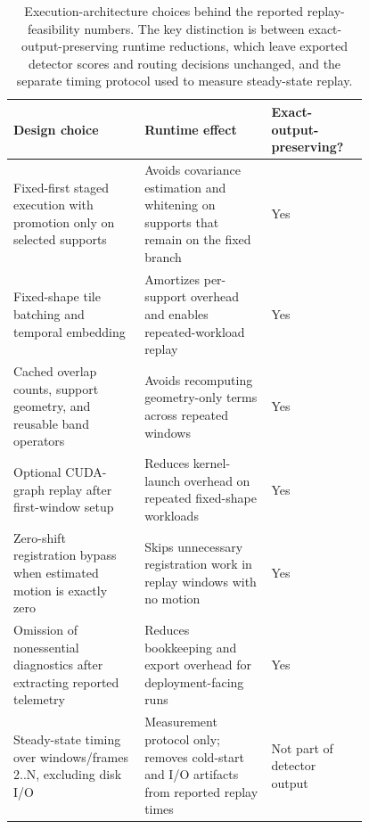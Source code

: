 \documentclass[11pt]{article}
\begin{document}
\begin{table}[t]
\centering
\small
\begin{tabular}{P{0.31\linewidth} P{0.30\linewidth} C{0.18\linewidth}}
\toprule
\textbf{Design choice} & \textbf{Runtime effect} & \textbf{Exact-output-preserving?} \\
\midrule
Fixed-first staged execution with promotion only on selected supports & Avoids covariance estimation and whitening on supports that remain on the fixed branch & Yes \\
Fixed-shape tile batching and temporal embedding & Amortizes per-support overhead and enables repeated-workload replay & Yes \\
Cached overlap counts, support geometry, and reusable band operators & Avoids recomputing geometry-only terms across repeated windows & Yes \\
Optional CUDA-graph replay after first-window setup & Reduces kernel-launch overhead on repeated fixed-shape workloads & Yes \\
Zero-shift registration bypass when estimated motion is exactly zero & Skips unnecessary registration work in replay windows with no motion & Yes \\
Omission of nonessential diagnostics after extracting reported telemetry & Reduces bookkeeping and export overhead for deployment-facing runs & Yes \\
Steady-state timing over windows/frames 2..N, excluding disk I/O & Measurement protocol only; removes cold-start and I/O artifacts from reported replay times & Not part of detector output \\
\bottomrule
\end{tabular}
\caption{Execution-architecture choices behind the reported replay-feasibility numbers. The key distinction is between exact-output-preserving runtime reductions, which leave exported detector scores and routing decisions unchanged, and the separate timing protocol used to measure steady-state replay.}
\label{tab:execution_architecture_runtime}
\end{table}
\end{document}
